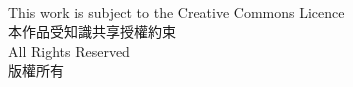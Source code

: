 \documentclass[12pt,a4paper]{report}  %
\begin{document}
\begin{center}
\fontsize{12}{22}\selectfont {Academic Year 2020 – 2021}\\
\fontsize{12}{22}\selectfont {2020 – 2021 學年}
\end{center}
\thispagestyle{empty}
\newpage
\vspace*{\fill}
\vspace*{\fill}
\begin{raggedright}
    \fontsize{12}{14}\selectfont This work is subject to the Creative Commons Licence\\
    \fontsize{12}{14}\selectfont 本作品受知識共享授權約束\\[2ex]
    \fontsize{12}{12}\selectfont All Rights Reserved\\
    \fontsize{12}{12}\selectfont 版權所有\\

\end{raggedright}
\thispagestyle{empty}
\newpage

\newpage

\newpage
\renewcommand{\contentsname}{\centerline{\fontsize{18pt}{\baselineskip}\selectfont\textbf{目\quad 錄}}}
\tableofcontents　　%
\newpage

\renewcommand{\listfigurename}{\centerline{\fontsize{18pt}{\baselineskip}\selectfont\textbf{圖\quad 目\quad 錄 }}}
\newcommand{\loflabel}{圖} %
\renewcommand{\numberline}[1]{\loflabel~#1\hspace*{0.5em}}
\listoffigures
\newcommand{\captioname}{圖}
\newpage
\renewcommand{\listtablename}{\centerline{\fontsize{18pt}{\baselineskip}\selectfont\textbf{表\quad 目\quad 錄 }}}
\newcommand{\lotlabel}{表} %
\renewcommand{\numberline}[1]{\lotlabel~#1\hspace*{0.5em}}
\listoftables

\newpage

\newpage

\newpage

\newpage

\newpage
%

\newpage

\newpage

\newpage
\end{document}

